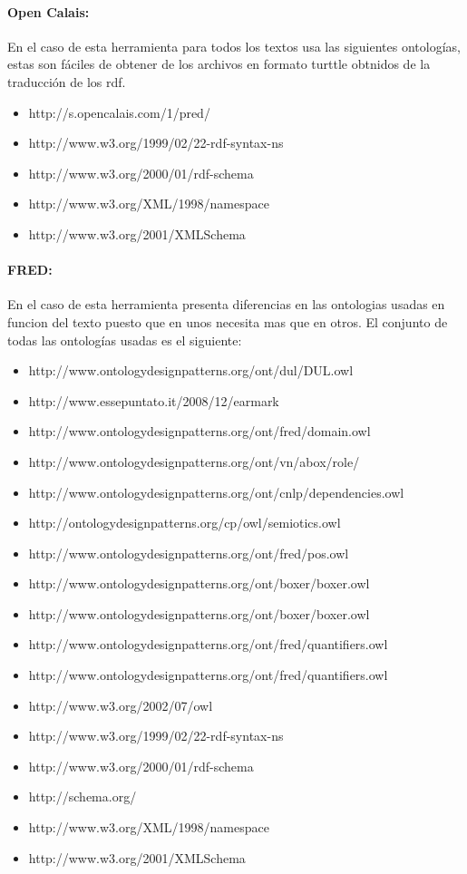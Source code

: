 \documentclass[spanish]{llncs}   %
\begin{document}
\paragraph{Open Calais:} En el caso de esta herramienta para todos los textos usa las siguientes ontologías, estas son fáciles de obtener
de los archivos en formato turttle obtnidos de la traducción de los rdf.

\begin{itemize}
    \item http://s.opencalais.com/1/pred/
    \item http://www.w3.org/1999/02/22-rdf-syntax-ns
    \item http://www.w3.org/2000/01/rdf-schema
    \item http://www.w3.org/XML/1998/namespace
    \item http://www.w3.org/2001/XMLSchema
\end{itemize}

\paragraph{FRED:} En el caso de esta herramienta presenta diferencias en las ontologias usadas en funcion del texto puesto que 
en unos necesita mas que en otros. El conjunto de todas las ontologías usadas es el siguiente:

\begin{itemize}
    \item http://www.ontologydesignpatterns.org/ont/dul/DUL.owl
    \item http://www.essepuntato.it/2008/12/earmark
    \item http://www.ontologydesignpatterns.org/ont/fred/domain.owl
    \item http://www.ontologydesignpatterns.org/ont/vn/abox/role/
    \item http://www.ontologydesignpatterns.org/ont/cnlp/dependencies.owl
    \item http://ontologydesignpatterns.org/cp/owl/semiotics.owl
    \item http://www.ontologydesignpatterns.org/ont/fred/pos.owl
    \item http://www.ontologydesignpatterns.org/ont/boxer/boxer.owl
    \item http://www.ontologydesignpatterns.org/ont/boxer/boxer.owl
    \item http://www.ontologydesignpatterns.org/ont/fred/quantifiers.owl
    \item http://www.ontologydesignpatterns.org/ont/fred/quantifiers.owl
    \item http://www.w3.org/2002/07/owl
    \item http://www.w3.org/1999/02/22-rdf-syntax-ns
    \item http://www.w3.org/2000/01/rdf-schema
    \item http://schema.org/
    \item http://www.w3.org/XML/1998/namespace
    \item http://www.w3.org/2001/XMLSchema
\end{itemize}
\end{document}
